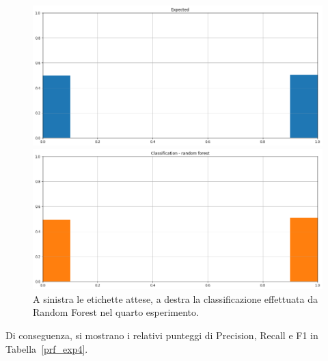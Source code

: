 \documentclass[12pt]{report}
\theoremstyle{definition}
\begin{document}
\begin{figure}
\centering
    \begin{minipage}{0.48\textwidth}
        \includegraphics[width=\linewidth]{images/experiment_uniform_sovrapposti/expected_classification.png}
    \end{minipage}
    \begin{minipage}{0.48\textwidth}
        \includegraphics[width=\linewidth]{images/experiment_uniform_sovrapposti/prediction_classification_rf.png}
    \end{minipage}
    \caption{A sinistra le etichette attese, a destra la classificazione effettuata da Random Forest nel quarto esperimento.}
    \label{rf_class_exp4}
\end{figure} 
Di conseguenza, si mostrano i relativi punteggi di Precision, Recall e F1 in Tabella~\ref{prf_exp4}.
\end{document}
